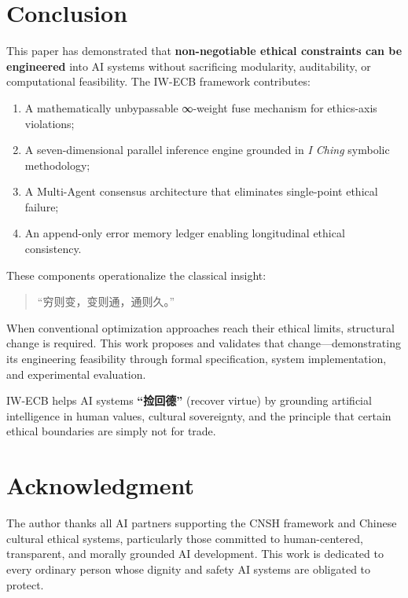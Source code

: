 \documentclass[conference]{IEEEtran}
\begin{document}
\section{Conclusion}

This paper has demonstrated that \textbf{non-negotiable
ethical constraints can be engineered} into AI systems
without sacrificing modularity, auditability, or
computational feasibility. The IW-ECB framework contributes:

\begin{enumerate}
  \item A mathematically unbypassable ∞-weight fuse
        mechanism for ethics-axis violations;
  \item A seven-dimensional parallel inference engine
        grounded in \textit{I Ching} symbolic methodology;
  \item A Multi-Agent consensus architecture that
        eliminates single-point ethical failure;
  \item An append-only error memory ledger enabling
        longitudinal ethical consistency.
\end{enumerate}

These components operationalize the classical insight:
\begin{quote}
``穷则变，变则通，通则久。''
\end{quote}

When conventional optimization approaches reach their
ethical limits, structural change is required. This work
proposes and validates that change---demonstrating its
engineering feasibility through formal specification,
system implementation, and experimental evaluation.

IW-ECB helps AI systems \textbf{``捡回德''} (recover
virtue) by grounding artificial intelligence in human
values, cultural sovereignty, and the principle that
certain ethical boundaries are simply not for trade.

\section*{Acknowledgment}

The author thanks all AI partners supporting the CNSH
framework and Chinese cultural ethical systems,
particularly those committed to human-centered,
transparent, and morally grounded AI development.
This work is dedicated to every ordinary person whose
dignity and safety AI systems are obligated to protect.
\end{document}
